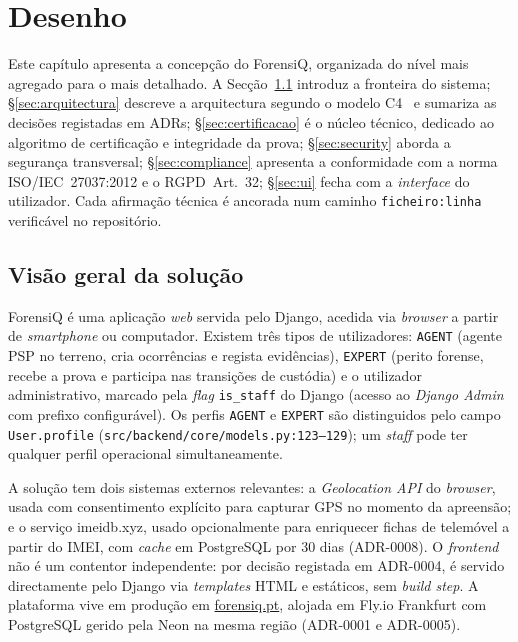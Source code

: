 
\section{Desenho}
\label{cap:desenho}

Este capítulo apresenta a concepção do ForensiQ, organizada do nível
mais agregado para o mais detalhado. A Secção~\ref{sec:visao-geral}
introduz a fronteira do sistema; \S\ref{sec:arquitectura} descreve a
arquitectura segundo o modelo C4~\citep{brown2014} e sumariza as
decisões registadas em ADRs; \S\ref{sec:certificacao} é o núcleo
técnico, dedicado ao algoritmo de certificação e integridade da prova;
\S\ref{sec:security} aborda a segurança transversal;
\S\ref{sec:compliance} apresenta a conformidade com a norma
ISO/IEC~27037:2012 e o RGPD~Art.~32; \S\ref{sec:ui} fecha com a
\emph{interface} do utilizador. Cada afirmação técnica é ancorada num
caminho \texttt{ficheiro:linha} verificável no repositório.

\subsection{Visão geral da solução}
\label{sec:visao-geral}

ForensiQ é uma aplicação \emph{web} servida pelo Django, acedida
via \emph{browser} a partir de \emph{smartphone} ou computador.
Existem três tipos de utilizadores: \texttt{AGENT} (agente PSP no
terreno, cria ocorrências e regista evidências), \texttt{EXPERT}
(perito forense, recebe a prova e participa nas transições de
custódia) e o utilizador administrativo, marcado pela \emph{flag}
\texttt{is\_staff} do Django (acesso ao \emph{Django Admin} com
prefixo configurável). Os perfis \texttt{AGENT} e \texttt{EXPERT}
são distinguidos pelo campo \texttt{User.profile}
(\texttt{src/backend/core/models.py:123--129}); um \emph{staff} pode
ter qualquer perfil operacional simultaneamente.

A solução tem dois sistemas externos relevantes: a \emph{Geolocation
API} do \emph{browser}, usada com consentimento explícito para
capturar GPS no momento da apreensão; e o serviço imeidb.xyz, usado
opcionalmente para enriquecer fichas de telemóvel a partir do IMEI,
com \emph{cache} em PostgreSQL por 30 dias (ADR-0008). O
\emph{frontend} não é um contentor independente: por decisão
registada em ADR-0004, é servido directamente pelo Django via
\emph{templates} HTML e estáticos, sem \emph{build step}. A
plataforma vive em produção em
\href{https://forensiq.pt}{forensiq.pt}, alojada em Fly.io
Frankfurt com PostgreSQL gerido pela Neon na mesma região (ADR-0001
e ADR-0005).

